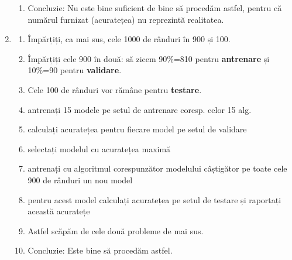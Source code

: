 \documentclass[12pt]{article}
\begin{document}
\begin{enumerate}
\begin{enumerate}
			\item Concluzie: Nu este bine suficient de bine să procedăm astfel, pentru că numărul furnizat (acuratețea) nu reprezintă realitatea.
		\end{enumerate}
		\item \begin{enumerate}
			\item Împărțiți, ca mai sus, cele 1000 de rânduri în 900 și 100.
			\item Împărțiți cele 900 în două: să zicem 90\%=810 pentru \textbf{antrenare} și 10\%=90 pentru \textbf{validare}.
			\item Cele 100 de rânduri vor rămâne pentru \textbf{testare}.
			\item antrenați 15 modele pe setul de antrenare coresp. celor 15 alg.
			\item calculați acuratețea pentru fiecare model pe setul de validare
			\item selectați modelul cu acuratețea maximă
			\item antrenați cu algoritmul corespunzător modelului câștigător pe toate cele 900 de rânduri un nou model
			\item pentru acest model calculați acuratețea pe setul de testare și raportați această acuratețe
			\item Astfel scăpăm de cele două probleme de mai sus.
			\item Concluzie: Este bine să procedăm astfel.
			

\end{enumerate}
\end{enumerate}
\end{document}
